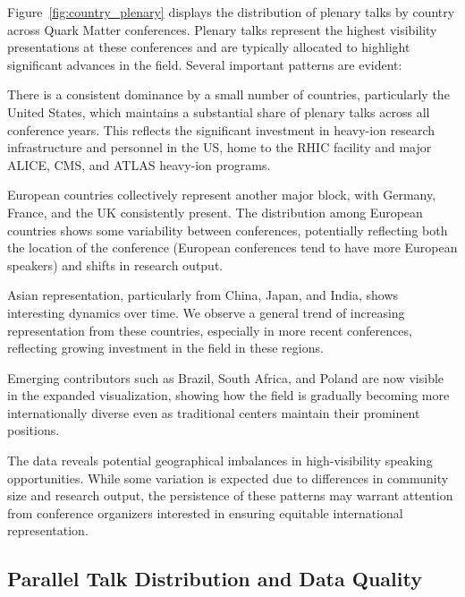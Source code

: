 \documentclass[a4paper,11pt]{article}
\begin{document}
Figure~\ref{fig:country_plenary} displays the distribution of plenary talks by country across Quark Matter conferences. Plenary talks represent the highest visibility presentations at these conferences and are typically allocated to highlight significant advances in the field. Several important patterns are evident:

There is a consistent dominance by a small number of countries, particularly the United States, which maintains a substantial share of plenary talks across all conference years. This reflects the significant investment in heavy-ion research infrastructure and personnel in the US, home to the RHIC facility and major ALICE, CMS, and ATLAS heavy-ion programs.

European countries collectively represent another major block, with Germany, France, and the UK consistently present. The distribution among European countries shows some variability between conferences, potentially reflecting both the location of the conference (European conferences tend to have more European speakers) and shifts in research output.

Asian representation, particularly from China, Japan, and India, shows interesting dynamics over time. We observe a general trend of increasing representation from these countries, especially in more recent conferences, reflecting growing investment in the field in these regions.

Emerging contributors such as Brazil, South Africa, and Poland are now visible in the expanded visualization, showing how the field is gradually becoming more internationally diverse even as traditional centers maintain their prominent positions.

The data reveals potential geographical imbalances in high-visibility speaking opportunities. While some variation is expected due to differences in community size and research output, the persistence of these patterns may warrant attention from conference organizers interested in ensuring equitable international representation.

\subsection{Parallel Talk Distribution and Data Quality}
\end{document}
